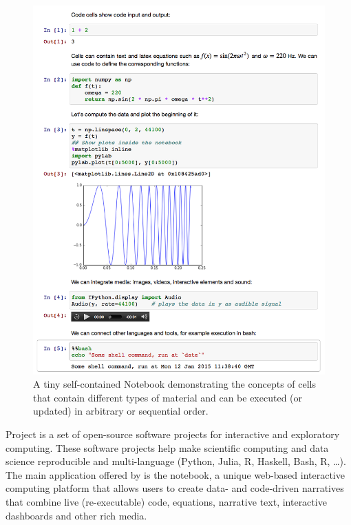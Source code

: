 
\begin{figure}
\includegraphics[scale=0.23]{Pictures/jupyterdemo1.png}
\caption{\label{fig:jupyterdemo} A tiny self-contained Notebook demonstrating the concepts of cells that contain different types of material and can be executed (or updated) in arbitrary or sequential order.}
\end{figure}

Project \Jupyter is a set of open-source software projects for
interactive and exploratory computing. These software projects help
make scientific computing and data science reproducible and
multi-language (Python, Julia, R, Haskell, Bash, R, \ldots). The main
application offered by \Jupyter is the \Jupyter notebook, a unique
web-based interactive computing platform that allows users to create
data- and code-driven narratives that combine live (re-executable)
code, equations, narrative text, interactive dashboards and other rich
media. 

